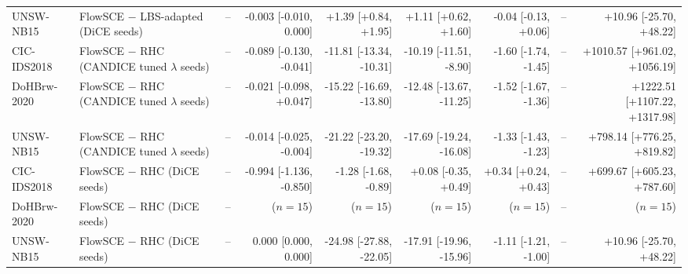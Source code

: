 \begin{table}[t]
\begin{tabular}{@{}llrrrrrrr@{}}
UNSW-NB15 & FlowSCE $-$ LBS-adapted (DiCE seeds) & -- & -0.003 [-0.010, 0.000] & +1.39 [+0.84, +1.95] & +1.11 [+0.62, +1.60] & -0.04 [-0.13, +0.06] & -- & +10.96 [-25.70, +48.22] \\
CIC-IDS2018 & FlowSCE $-$ RHC (CANDICE tuned $\lambda$ seeds) & -- & -0.089 [-0.130, -0.041] & -11.81 [-13.34, -10.31] & -10.19 [-11.51, -8.90] & -1.60 [-1.74, -1.45] & -- & +1010.57 [+961.02, +1056.19] \\
DoHBrw-2020 & FlowSCE $-$ RHC (CANDICE tuned $\lambda$ seeds) & -- & -0.021 [-0.098, +0.047] & -15.22 [-16.69, -13.80] & -12.48 [-13.67, -11.25] & -1.52 [-1.67, -1.36] & -- & +1222.51 [+1107.22, +1317.98] \\
UNSW-NB15 & FlowSCE $-$ RHC (CANDICE tuned $\lambda$ seeds) & -- & -0.014 [-0.025, -0.004] & -21.22 [-23.20, -19.32] & -17.69 [-19.24, -16.08] & -1.33 [-1.43, -1.23] & -- & +798.14 [+776.25, +819.82] \\
CIC-IDS2018 & FlowSCE $-$ RHC (DiCE seeds) & -- & -0.994 [-1.136, -0.850] & -1.28 [-1.68, -0.89] & +0.08 [-0.35, +0.49] & +0.34 [+0.24, +0.43] & -- & +699.67 [+605.23, +787.60] \\
DoHBrw-2020 & FlowSCE $-$ RHC (DiCE seeds) & -- & ($n=15$) & ($n=15$) & ($n=15$) & ($n=15$) & -- & ($n=15$) \\
UNSW-NB15 & FlowSCE $-$ RHC (DiCE seeds) & -- & 0.000 [0.000, 0.000] & -24.98 [-27.88, -22.05] & -17.91 [-19.96, -15.96] & -1.11 [-1.21, -1.00] & -- & +10.96 [-25.70, +48.22] \\
\bottomrule
\end{tabular}
\end{table}
